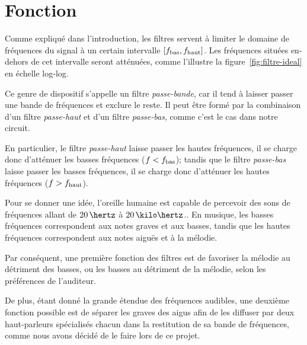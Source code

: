 \section{Fonction}

Comme expliqué dans l'introduction, les filtres servent à limiter
le domaine de fréquences du signal à un certain intervalle
$[f_{\mathrm{bas}},f_{\mathrm{haut}}]$.
Les fréquences situées en-dehors de cet intervalle seront atténuées,
comme l'illustre la figure~\ref{fig:filtre-ideal} en échelle log-log.

Ce genre de dispositif s'appelle un filtre \emph{passe-bande},
car il tend à laisser passer une bande de fréquences et exclure le reste.
\cite{highpass-def}
Il peut être formé par la combinaison d'un filtre
\emph{passe-haut} et d'un filtre \emph{passe-bas},\cite{high-low-pass-combined}
comme c'est le cas dans notre circuit.

En particulier,
le filtre \emph{passe-haut} laisse passer les hautes fréquences,
il se charge donc d'atténuer les basses fréquences ($f<f_{\mathrm{bas}}$);
tandis que le filtre \emph{passe-bas} laisse passer les basses fréquences,
il se charge donc d'atténuer les hautes fréquences ($f>f_{\mathrm{haut}}$).

Pour se donner une idée,
l'oreille humaine est capable de percevoir des sons de fréquences
allant de $20\,\hertz$ à $20\,\kilo\hertz$.\cite{hearing-range}.
En musique, les basses fréquences correspondent aux notes graves et aux basses,
tandis que les hautes fréquences correspondent aux notes aiguës et
à la mélodie.

Par conséquent, une première fonction des filtres est de
favoriser la mélodie au détriment des
basses, ou les basses au détriment de la mélodie, selon les préférences
de l'auditeur.

De plus, étant donné la grande étendue des fréquences audibles,
une deuxième fonction possible est de séparer les graves des aigus
afin de les diffuser par deux haut-parleurs spécialisés chacun
dans la restitution de sa bande de fréquences,
comme nous avons décidé de le faire lors de ce projet.

